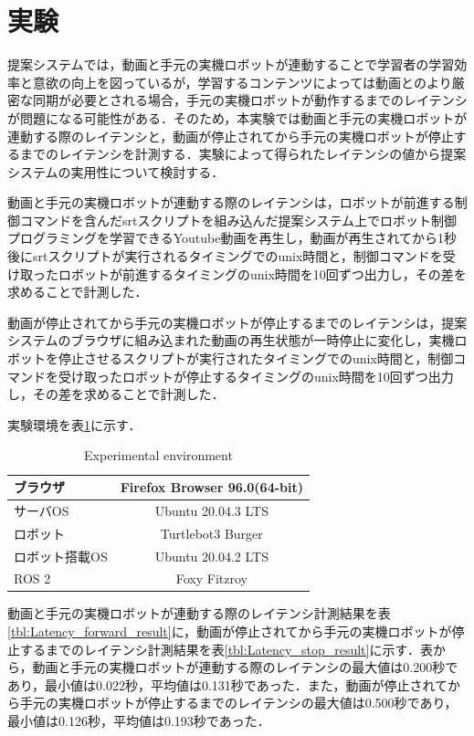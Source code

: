 \documentclass{ujarticle}
\begin{document}
\section{実験}
提案システムでは，動画と手元の実機ロボットが連動することで学習者の学習効率と意欲の向上を図っているが，学習するコンテンツによっては動画とのより厳密な同期が必要とされる場合，手元の実機ロボットが動作するまでのレイテンシが問題になる可能性がある．そのため，本実験では動画と手元の実機ロボットが連動する際のレイテンシと，動画が停止されてから手元の実機ロボットが停止するまでのレイテンシを計測する．実験によって得られたレイテンシの値から提案システムの実用性について検討する．
\par 動画と手元の実機ロボットが連動する際のレイテンシは，ロボットが前進する制御コマンドを含んだsrtスクリプトを組み込んだ提案システム上でロボット制御プログラミングを学習できるYoutube動画を再生し，動画が再生されてから1秒後にsrtスクリプトが実行されるタイミングでのunix時間と，制御コマンドを受け取ったロボットが前進するタイミングのunix時間を10回ずつ出力し，その差を求めることで計測した．
\par 動画が停止されてから手元の実機ロボットが停止するまでのレイテンシは，提案システムのブラウザに組み込まれた動画の再生状態が一時停止に変化し，実機ロボットを停止させるスクリプトが実行されたタイミングでのunix時間と，制御コマンドを受け取ったロボットが停止するタイミングのunix時間を10回ずつ出力し，その差を求めることで計測した．
\par 実験環境を表\ref{tbl:environment}に示す．

\begin{table}[t]
 \caption{Experimental environment}
 \label{tbl:environment}
 \centering
 \footnotesize
 \begin{tabular}{|p{}|c|}
  \hline
	ブラウザ	&Firefox Browser 96.0(64-bit) \\\hline
	サーバOS	&Ubuntu 20.04.3 LTS \\\hline
	ロボット	&Turtlebot3 Burger \\\hline
	ロボット搭載OS	&Ubuntu 20.04.2 LTS \\\hline
	ROS	2 &Foxy Fitzroy \\\hline
 \end{tabular}
\end{table}

\par 動画と手元の実機ロボットが連動する際のレイテンシ計測結果を表\ref{tbl:Latency_forward_result}に，動画が停止されてから手元の実機ロボットが停止するまでのレイテンシ計測結果を表\ref{tbl:Latency_stop_result}に示す．表から，動画と手元の実機ロボットが連動する際のレイテンシの最大値は0.200秒であり，最小値は0.022秒，平均値は0.131秒であった．また，動画が停止されてから手元の実機ロボットが停止するまでのレイテンシの最大値は0.500秒であり，最小値は0.126秒，平均値は0.193秒であった．
\end{document}
